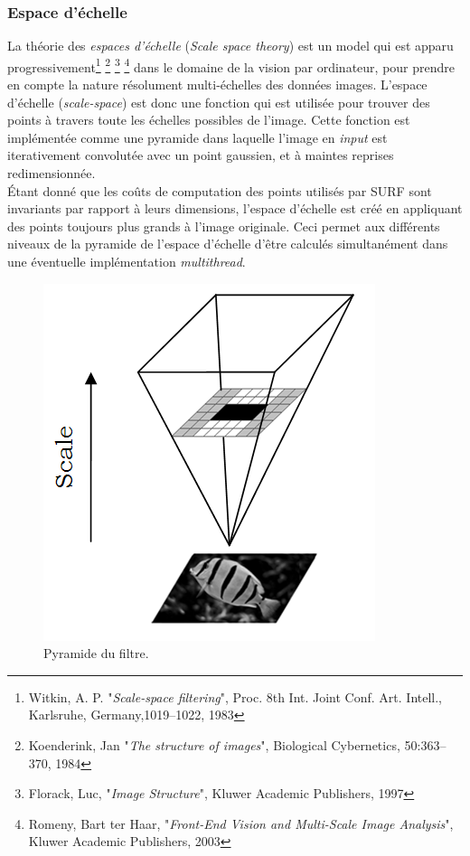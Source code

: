 \documentclass[a4paper,11pt]{report}
\begin{document}
\subsubsection{Espace d'échelle}
La théorie des \textit{espaces d'échelle} (\textit{Scale space theory}) est un model qui est apparu progressivement\footnote{Witkin, A. P. "\textit{Scale-space filtering}", Proc. 8th Int. Joint Conf. Art. Intell., Karlsruhe, Germany,1019–1022, 1983} \footnote{Koenderink, Jan "\textit{The structure of images}", Biological Cybernetics, 50:363–370, 1984} \footnote{Florack, Luc, "\textit{Image Structure}", Kluwer Academic Publishers, 1997} \footnote{Romeny, Bart ter Haar, "\textit{Front-End Vision and Multi-Scale Image Analysis}", Kluwer Academic Publishers, 2003} dans le domaine de la vision par ordinateur, pour prendre en compte la nature résolument multi-échelles des données images. L'espace d'échelle (\textit{scale-space}) est donc une fonction qui est utilisée pour trouver des points à travers toute les échelles possibles de l'image. Cette fonction est implémentée comme une pyramide dans laquelle l'image en \textit{input} est iterativement convolutée avec un point gaussien, et à maintes reprises redimensionnée. 
\\\'Etant donné que les coûts de computation des points utilisés par SURF sont invariants par rapport à leurs dimensions, l'espace d'échelle est créé en appliquant des points toujours plus grands à l'image originale. Ceci permet aux différents niveaux de la pyramide de l'espace d'échelle d'être calculés simultanément dans une éventuelle implémentation \textit{multithread}.
\begin{figure}[ht]
\centering
\includegraphics[scale=0.3]{figure4.png}
\caption{Pyramide du filtre.}
\label{fig4}
\end{figure}
\end{document}
